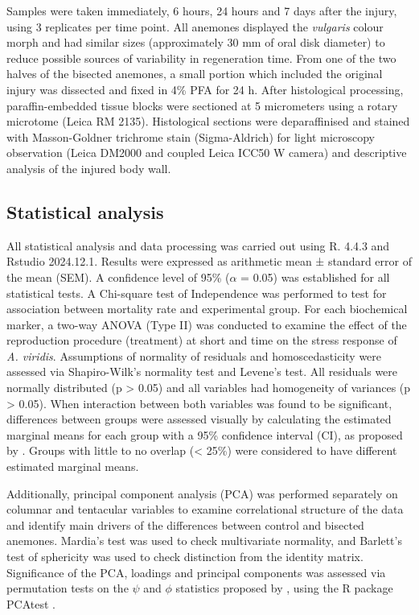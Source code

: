 \documentclass[final,3p,times,authoryear]{elsarticle}
\begin{document}
Samples were taken immediately, 6 hours, 24 hours and 7 days  after the injury, using 3 replicates per time point. All anemones displayed the \textit{vulgaris} colour morph \citep{Porro2019} and had similar sizes (approximately 30 mm of oral disk diameter) to reduce possible sources of variability in regeneration time. From one of the two halves of the bisected anemones, a small portion which included the original injury was dissected and fixed in 4\% PFA for 24 h. After histological processing, paraffin-embedded tissue blocks were sectioned at 5 micrometers using a rotary microtome (Leica RM 2135). Histological sections were deparaffinised and stained with Masson-Goldner trichrome stain (Sigma-Aldrich) for light microscopy observation (Leica DM2000 and coupled Leica ICC50 W camera) and descriptive analysis of the injured body wall.

\subsection{Statistical analysis}
\label{subsec5}

All statistical analysis and data processing was carried out using R. 4.4.3 and Rstudio 2024.12.1. Results were expressed as arithmetic mean ± standard error of the mean (SEM). A confidence level of 95\% ($\alpha$ = 0.05) was established for all statistical tests. A Chi-square test of Independence was performed to test for association between mortality rate and experimental group. For each biochemical marker, a two-way ANOVA (Type II) was conducted to examine the effect of the reproduction procedure (treatment) at short and time on the stress response of \textit{A. viridis}. Assumptions of normality of residuals and homoscedasticity were assessed via Shapiro-Wilk’s normality test and Levene’s test. All residuals were normally distributed (p > 0.05) and all variables had homogeneity of variances (p > 0.05). When interaction between both variables was found to be significant, differences between groups were assessed visually by calculating the estimated marginal means for each group with a 95\% confidence interval (CI), as proposed by \citep{Garofalo2022}. Groups with little to no overlap (< 25\%) were considered to have different estimated marginal means.

Additionally, principal component analysis (PCA) was performed separately on columnar and tentacular variables to examine correlational structure of the data and identify main drivers of the differences between control and bisected anemones. Mardia's test was used to check multivariate normality, and Barlett's test of sphericity was used to check distinction from the identity matrix. Significance of the PCA, loadings and principal components was assessed via permutation tests on the  $\psi$ and $\phi$ statistics proposed by \citet{Vieira2012}, using the R package PCAtest \citep{Camargo2022}.
\end{document}
